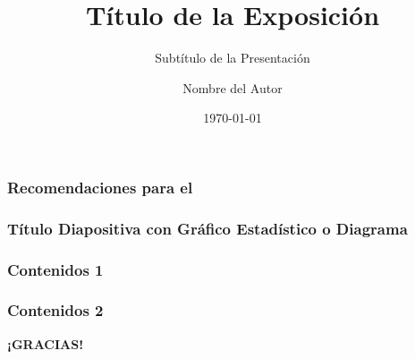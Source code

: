 \documentclass[aspectratio=169]{beamer}
\title{Título de la Exposición}
\subtitle{Subtítulo de la Presentación}
\author{Nombre del Autor}
\institute{UNAD}
\date{\today}
\institute{Unidad/Zona/Grupo o Equipo Funcional}
\begin{document}
{%
	\frame{\titlepage}
}

\begin{frame}[t]\frametitle{Recomendaciones para el }
    


\end{frame}

\begin{frame}[t]\frametitle{Título Diapositiva con Gráfico Estadístico o Diagrama}

\end{frame}

\begin{frame}[t]\frametitle{Contenidos 1}

\end{frame}

\begin{frame}[t]\frametitle{Contenidos 2}

\end{frame}

{%
	\begin{frame}
		\vskip3.2cm
		\centering
		\LARGE\textcolor{myblue}{\textbf{¡GRACIAS!}}
	\end{frame}
	
}
\end{document}
